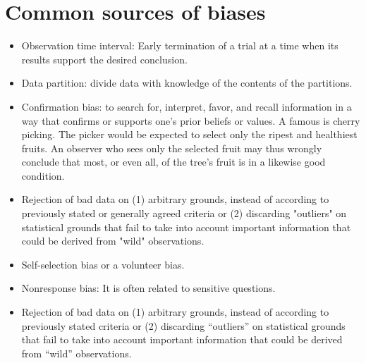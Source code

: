 \hypertarget{data}{%
  \section{Common sources of biases}\label{sources-bias}}
\begin{itemize}
\item Observation time interval: 
Early termination of a trial at a time when its results support the desired conclusion.
\item Data partition: divide data with knowledge of the contents of the partitions. 
\item Confirmation bias: to search for, interpret, favor, and recall information in a way that confirms or supports one's prior beliefs or values. A famous is cherry picking. %
  The picker would be expected to select only the ripest and healthiest fruits. An observer who sees only the selected fruit may thus wrongly conclude that most, or even all, of the tree's fruit is in a likewise good condition.
\item Rejection of bad data on (1) arbitrary grounds, instead of according to previously stated or generally agreed criteria or (2) discarding "outliers" on statistical grounds that fail to take into account important information that could be derived from "wild" observations.
\item Self-selection bias or a volunteer bias.  %
\item Nonresponse bias: It is often related to sensitive questions.
\item Rejection of bad data on (1) arbitrary grounds, instead of according to previously stated criteria or (2) discarding ``outliers'' on statistical grounds that fail to take into account important information that could be derived from ``wild'' observations.

\end{itemize}
